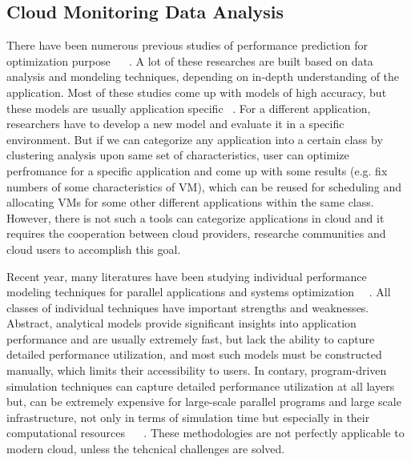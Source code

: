 \subsection{Cloud Monitoring Data Analysis}


There have been numerous previous studies of performance prediction for optimization purpose~\cite{Yang2005} ~\cite{Matsunaga2010} . A lot of these researches are built based on data analysis and mondeling techniques, depending on in-depth understanding of the application. Most of these studies come up with models of high accuracy, but these models are usually application specific ~\cite{Shan2008}. For a different application, researchers have to develop a new model and evaluate it in a specific environment. But if we can categorize any application into a certain class by clustering analysis upon same set of characteristics, user can optimize perfromance for a specific application and come up with some results (e.g. fix numbers of some characteristics of VM), which can be reused for scheduling and allocating VMs for some other different applications within the same class. However, there is not such a tools can categorize applications in cloud and it requires the cooperation between cloud providers, researche communities and cloud users to accomplish this goal.

Recent year, many literatures have been studying individual performance modeling techniques for parallel applications and systems optimization ~\cite{Brian98}~\cite{Yang2005}. All classes of individual techniques have important strengths and weaknesses. Abstract, analytical models provide significant insights into application performance and are usually extremely fast, but lack the ability to capture detailed performance utilization, and most such models must be constructed manually, which limits their accessibility to users. In contary, program-driven simulation techniques can capture detailed performance utilization at all layers but, can be extremely expensive for large-scale parallel programs and large scale infrastructure, not only in terms of simulation time but especially in their computational resources ~\cite{Huaxia1999} ~\cite{Michael2015}. These methodologies are not perfectly applicable to modern cloud, unless the tehcnical challenges are solved.


